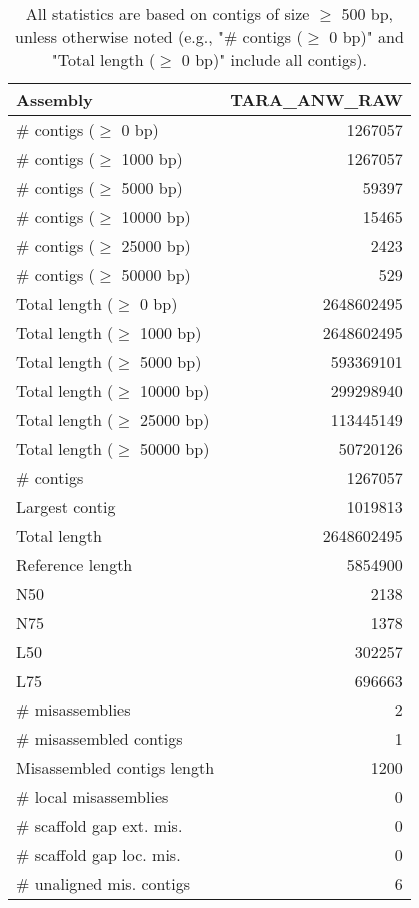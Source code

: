 \documentclass[12pt,a4paper]{article}
\begin{document}
\begin{table}[ht]
\begin{center}
\caption{All statistics are based on contigs of size $\geq$ 500 bp, unless otherwise noted (e.g., "\# contigs ($\geq$ 0 bp)" and "Total length ($\geq$ 0 bp)" include all contigs).}
\begin{tabular}{|l*{1}{|r}|}
\hline
Assembly & TARA\_ANW\_RAW \\ \hline
\# contigs ($\geq$ 0 bp) & 1267057 \\ \hline
\# contigs ($\geq$ 1000 bp) & 1267057 \\ \hline
\# contigs ($\geq$ 5000 bp) & 59397 \\ \hline
\# contigs ($\geq$ 10000 bp) & 15465 \\ \hline
\# contigs ($\geq$ 25000 bp) & 2423 \\ \hline
\# contigs ($\geq$ 50000 bp) & 529 \\ \hline
Total length ($\geq$ 0 bp) & 2648602495 \\ \hline
Total length ($\geq$ 1000 bp) & 2648602495 \\ \hline
Total length ($\geq$ 5000 bp) & 593369101 \\ \hline
Total length ($\geq$ 10000 bp) & 299298940 \\ \hline
Total length ($\geq$ 25000 bp) & 113445149 \\ \hline
Total length ($\geq$ 50000 bp) & 50720126 \\ \hline
\# contigs & 1267057 \\ \hline
Largest contig & 1019813 \\ \hline
Total length & 2648602495 \\ \hline
Reference length & 5854900 \\ \hline
N50 & 2138 \\ \hline
N75 & 1378 \\ \hline
L50 & 302257 \\ \hline
L75 & 696663 \\ \hline
\# misassemblies & 2 \\ \hline
\# misassembled contigs & 1 \\ \hline
Misassembled contigs length & 1200 \\ \hline
\# local misassemblies & 0 \\ \hline
\# scaffold gap ext. mis. & 0 \\ \hline
\# scaffold gap loc. mis. & 0 \\ \hline
\# unaligned mis. contigs & 6 \\ \hline

\end{tabular}
\end{center}
\end{table}
\end{document}
